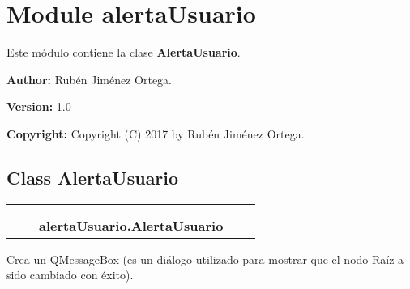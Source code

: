 %
%
%


\section{Module alertaUsuario}

    \label{alertaUsuario}
Este módulo contiene la clase \textbf{AlertaUsuario}.

\textbf{Author:} Rubén Jiménez Ortega.



\textbf{Version:} 1.0



\textbf{Copyright:} Copyright (C) 2017 by Rubén Jiménez Ortega.





\subsection{Class AlertaUsuario}

    \label{alertaUsuario:AlertaUsuario}
\begin{tabular}{cccccc}
\multicolumn{2}{r}{\settowidth{\BCL}{??-1}\multirow{2}{\BCL}{??-1}}
&&
  \\\cline{3-3}
  &&\multicolumn{1}{c|}{}
&&
  \\
&&\multicolumn{2}{l}{\textbf{alertaUsuario.AlertaUsuario}}
\end{tabular}

Crea un QMessageBox (es un diálogo utilizado para mostrar que el nodo Raíz 
a sido cambiado con éxito).



